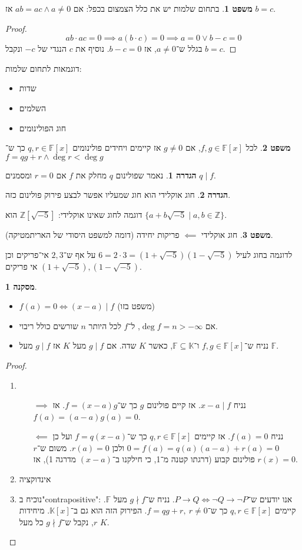 \documentclass[a4paper]{article}
\newcommand\Z     {\mathbb{Z}}
\newcommand\K     {\mathbb{K}}
\renewcommand\inf {\infty}
\newcommand\F         {\mathbb{F}}
\theoremstyle{definition}
\newtheorem{Theorem}{משפט}
\newtheorem{definition}{הגדרה}
\newtheorem{Collary}{מסקנה}
\newcommand\cola [1] {\begin{Collary}#1\end{Collary}}
\newcommand\theo  [1] {\begin{Theorem}#1\end{Theorem}}
\newcommand\defi  [1] {\begin{definition}#1\end{definition}}
\begin{document}
	\theo{בתחום שלמות יש את כלל הצמצום בכפל: אם $ab = ac \land a \neq 0$ אז $b = c$. }\begin{proof}
		\[ ab  \cdot ac = 0 \implies a(b \cdot c) = 0 \implies a = 0 \lor b - c = 0 \]
		בגלל ש־$a \neq 0$, אז $b - c = 0$. נוסיף את $c$ הנגדי של $-c$ ונקבל $b = c$. 
	\end{proof}
	
	דוגמאות לתחום שלמות: 
	\begin{itemize}
		\item שדות
		\item השלמים
		\item חוג הפולינומים
	\end{itemize}
	
	\theo{לכל $f, g \in \F[x]$, אם $g \neq 0$ אז קיימים ויחידים פולינומים $q, r \in \F[x]$ כך ש־$f = qg + r \land \deg r < \deg g$}
	
	\defi{נאמר שפולינום $q$ מחלק את $f$ אם $r = 0$ ומסמנים $q \mid f$. }
	
	\defi{חוג אוקלידי הוא חוג שמעליו אפשר לבצע פירוק פולינום כזה. }
	
	דוגמה לחוג שאינו אוקלידי: $\Z[\sqrt{-5}]$ הוא $\{a + b\sqrt{-5} \mid a, b \in \Z\}$. 
	
	\theo{חוג אוקלידי $\impliedby$ פריקות יחידה (דומה למשפט היסודי של האריתמטיקה). }
	
	לדוגמה בחוג לעיל $6 = 2 \cdot 3 = (1 + \sqrt{-5})(1 - \sqrt{-5})$ על אף ש־$2, 3$ אי־פריקים וכן $(1 + \sqrt{-5}), (1  - \sqrt{-5})$ אי פריקים. 
	
	\cola{\,
		\begin{itemize}
			\item $f(a) = 0 \iff (x - a) \mid f$ (משפט בזו)
			\item אם $\deg f = n > -\inf$, ל־$f$ לכל היותר $n$ שורשים כולל ריבוי. 
			\item נניח ש־$f, g \in \F[x]$ ו־$\F \subseteq \K$, כאשר $K$ שדה. אם $g \mid f$ מעל $K$ אז $g \mid f$ מעל $\F$. 
		\end{itemize}
	}
	\begin{proof}
		\begin{enumerate}\,
			\item \begin{itemize}
				\item[$\implies$] נניח $x - a \mid f$. אז קיים פולינום $g$ כך ש־$f = (x - a)g$. אז $f(a) = (a - a)g(a) = 0$. 
				\item[$\impliedby$] נניח $f(a) = 0$. אז קיימים $q, r \in \F[x]$ כך ש־$f = q(x - a)$ ועל כן $0 = f(a) = q(a)(a - a) + r(a) = 0$ ולכן $r(a) = 0$. משום ש־$r$ פולינום קבוע (דרגתו קטנה מ־1, כי חילקנו ב־$(x - a)$ מדרגה 1), אז $r(x) = 0$. 
			\end{itemize}
			\item אינדוקציה
			\item נוכיח ב"contrapositive": אנו יודעים ש־$P \to Q \iff \lnot Q \to \lnot P$. נניח ש־$g \nmid f$ מעל $\F$. קיימים $q, r \in \F[x]$ כך ש־$f =qg + r, \ r \neq 0$. הפירוק הזה הוא גם ב־$\K[x]$. מיחידות $r$, נקבל ש־$g \nmid f$ כל מעל $K$. 
		\end{enumerate}
	\end{proof}
	
\end{document}
